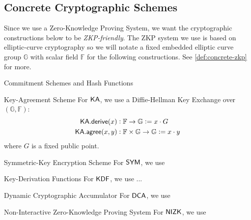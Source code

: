 

\subsection{Concrete Cryptographic Schemes}

Since we use a Zero-Knowledge Proving System, we want the cryptographic constructions below to be \emph{ZKP-friendly}. The ZKP system we use is based on elliptic-curve cryptography so we will notate a fixed embedded elliptic curve group $\mathbb{G}$ with scalar field $\mathbb{F}$ for the following constructions. See \autoref{def:concrete-zkp} for more.

\begin{definitiontoc}{Commitment Schemes and Hash Functions}
\end{definitiontoc}

\begin{definitiontoc}{Key-Agreement Scheme}
    For ${\textsf{KA}}$, we use a Diffie-Hellman Key Exchange over $(\mathbb{G}, \mathbb{F})$:
    \begin{align*}
        {\textsf{KA}}.{\textsf{derive}}(x)   &: \mathbb{F} \to \mathbb{G}                   := x \cdot G \\
        {\textsf{KA}}.{\textsf{agree}}(x, y) &: \mathbb{F} \times \mathbb{G} \to \mathbb{G} := x \cdot y
    \end{align*}
    where $G$ is a fixed public point.
\end{definitiontoc}

\begin{definitiontoc}{Symmetric-Key Encryption Scheme}
    For ${\textsf{SYM}}$, we use

\end{definitiontoc}

\begin{definitiontoc}{Key-Derivation Functions}
    For ${\textsf{KDF}}$, we use ... 
\end{definitiontoc}

\begin{definitiontoc}{Dynamic Cryptographic Accumulator}
    For ${\textsf{DCA}}$, we use

\end{definitiontoc}

\begin{definitiontoc}{Non-Interactive Zero-Knowledge Proving System} \label{def:concrete-zkp}
    For ${\textsf{NIZK}}$, we use

\end{definitiontoc}

